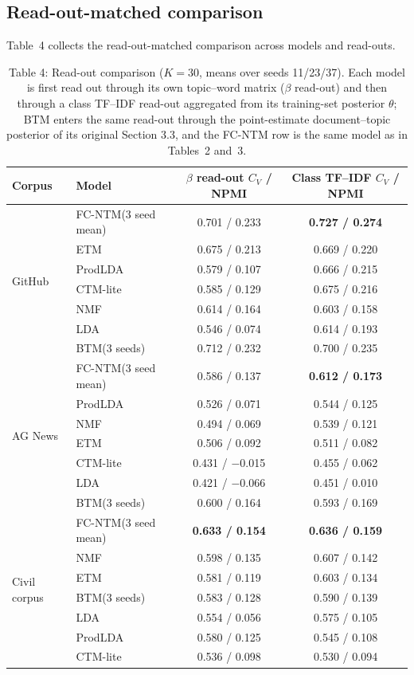 \documentclass{article}
\begin{document}
\subsection{Read-out-matched comparison}

Table~4 collects the read-out-matched comparison across models and read-outs.

\begin{table}[t]
\centering
\caption{Table 4: Read-out comparison ($K=30$, means over seeds 11/23/37). Each model is first read out through its own topic--word matrix ($\beta$ read-out) and then through a class TF--IDF read-out aggregated from its training-set posterior $\theta$; BTM enters the same read-out through the point-estimate document--topic posterior of its original Section 3.3, and the FC-NTM row is the same model as in Tables~2 and~3.}
\label{tab:fair}
\footnotesize
\setlength{\tabcolsep}{4pt}
\begin{tabular}{@{}llcc@{}}
\toprule
Corpus & Model & $\beta$ read-out $C_V$ / NPMI & Class TF--IDF $C_V$ / NPMI \\
\midrule
 \multirow{7}{*}{GitHub}
 & FC-NTM(3 seed mean) & 0.701 / 0.233 & \textbf{0.727 / 0.274} \\
 & ETM & 0.675 / 0.213 & 0.669 / 0.220 \\
 & ProdLDA & 0.579 / 0.107 & 0.666 / 0.215 \\
 & CTM-lite & 0.585 / 0.129 & 0.675 / 0.216 \\
 & NMF & 0.614 / 0.164 & 0.603 / 0.158 \\
 & LDA & 0.546 / 0.074 & 0.614 / 0.193 \\
 & BTM(3 seeds) & 0.712 / 0.232 & 0.700 / 0.235 \\
\midrule
 \multirow{7}{*}{AG News}
 & FC-NTM(3 seed mean) & 0.586 / 0.137 & \textbf{0.612 / 0.173} \\
 & ProdLDA & 0.526 / 0.071 & 0.544 / 0.125 \\
 & NMF & 0.494 / 0.069 & 0.539 / 0.121 \\
 & ETM & 0.506 / 0.092 & 0.511 / 0.082 \\
 & CTM-lite & 0.431 / $-$0.015 & 0.455 / 0.062 \\
 & LDA & 0.421 / $-$0.066 & 0.451 / 0.010 \\
 & BTM(3 seeds) & 0.600 / 0.164 & 0.593 / 0.169 \\
\midrule
 \multirow{7}{*}{Civil corpus}
 & FC-NTM(3 seed mean) & \textbf{0.633 / 0.154} & \textbf{0.636 / 0.159} \\
 & NMF & 0.598 / 0.135 & 0.607 / 0.142 \\
 & ETM & 0.581 / 0.119 & 0.603 / 0.134 \\
 & BTM(3 seeds) & 0.583 / 0.128 & 0.590 / 0.139 \\
 & LDA & 0.554 / 0.056 & 0.575 / 0.105 \\
 & ProdLDA & 0.580 / 0.125 & 0.545 / 0.108 \\
 & CTM-lite & 0.536 / 0.098 & 0.530 / 0.094 \\
\bottomrule
\end{tabular}
\end{table}
\end{document}
